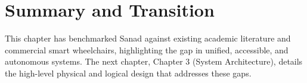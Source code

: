 \section{Summary and Transition}
This chapter has benchmarked Sanad against existing academic literature and commercial smart wheelchairs, highlighting the gap in unified, accessible, and autonomous systems. The next chapter, Chapter 3 (System Architecture), details the high-level physical and logical design that addresses these gaps.


